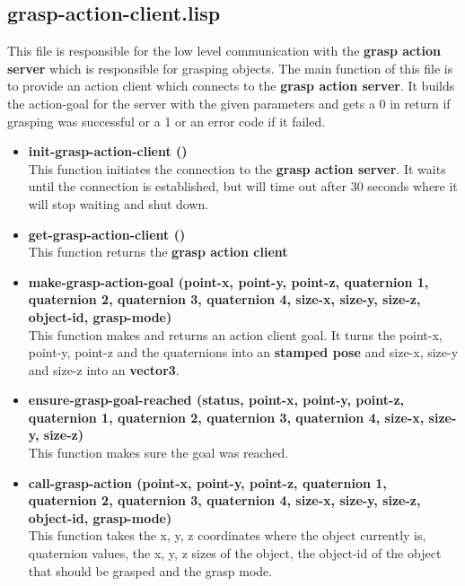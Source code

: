 \documentclass[main.tex]{subfiles}
\begin{document}
        \subsection{grasp-action-client.lisp}
        This file is responsible for the low level communication with the \textbf{grasp action server} which is responsible for grasping objects. The main function of this file is to provide an action client which connects to the \textbf{grasp action server}. It builds the action-goal for the server with the given parameters and gets a 0 in return if grasping was successful or a 1  or an error code if it failed.
        \begin{itemize}
            \item \textbf{init-grasp-action-client ()} \\
            This function initiates the connection to the \textbf{grasp action server}. It waits until the connection is established, but will time out after 30 seconds where it will stop waiting and shut down. 
            \item \textbf{get-grasp-action-client ()} \\
            This function returns the \textbf{grasp action client}
            \item \textbf{make-grasp-action-goal (point-x, point-y, point-z, quaternion 1, quaternion 2, quaternion 3, quaternion 4, size-x, size-y, size-z, object-id, grasp-mode)} \\
            This function makes and returns an action client goal. It turns the point-x, point-y, point-z and the quaternions into an \textbf{stamped pose} and size-x, size-y and size-z into an \textbf{vector3}.
            \item \textbf{ensure-grasp-goal-reached (status, point-x, point-y, point-z, quaternion 1, quaternion 2, quaternion 3, quaternion 4, size-x, size-y, size-z)} \\
            This function makes sure the goal was reached.
            \item \textbf{call-grasp-action (point-x, point-y, point-z, quaternion 1, quaternion 2, quaternion 3, quaternion 4, size-x, size-y, size-z, object-id, grasp-mode)} \\
            This function takes the x, y, z coordinates where the object currently is, quaternion values, the x, y, z sizes of the object, the object-id of the object that should be grasped and the grasp mode.
        \end{itemize}
\end{document}

